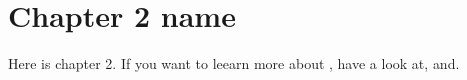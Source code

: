 \chapter{Chapter 2 name}\label{ch:ch2label}
Here is chapter 2. If you want to leearn  more about \LaTeXe{}, have a look at\cite{Madsen2010}, \cite{Oetiker2010} and\cite{Mittelbach2005}.

